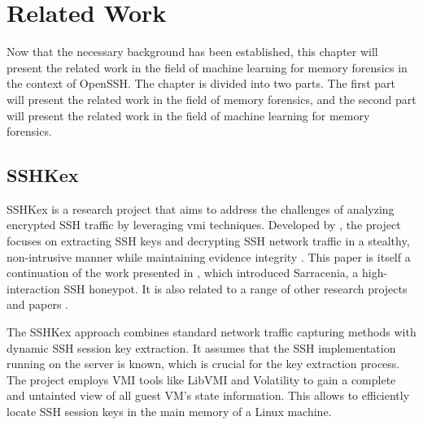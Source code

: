 \chapter{Related Work}\label{chapter:related_work}

%
%

Now that the necessary background has been established, this chapter will present the related work in the field of machine learning for memory forensics in the context of OpenSSH. The chapter is divided into two parts. The first part will present the related work in the field of memory forensics, and the second part will present the related work in the field of machine learning for memory forensics.

\section{SSHKex}\label{sec:background:kex:sshkex}
    
SSHKex is a research project that aims to address the challenges of analyzing encrypted SSH traffic by leveraging \acrfull{vmi} techniques. Developed by \citeauthor{SSHkex22}, the project focuses on extracting SSH keys and decrypting SSH network traffic in a stealthy, non-intrusive manner while maintaining evidence integrity \cite{SSHkex22}. This paper is itself a continuation of the work presented in  \cite{SarraceniaSSHHoneypot18}, which introduced Sarracenia, a high-interaction SSH honeypot. It is also related to a range of other research projects and papers \cite[section 5.6 and 6]{SSHkex22}.

The SSHKex approach combines standard network traffic capturing methods with dynamic SSH session key extraction. It assumes that the SSH implementation running on the server is known, which is crucial for the key extraction process. The project employs VMI tools like LibVMI and Volatility to gain a complete and untainted view of all guest VM's state information. This allows to efficiently locate SSH session keys in the main memory of a Linux machine. 

